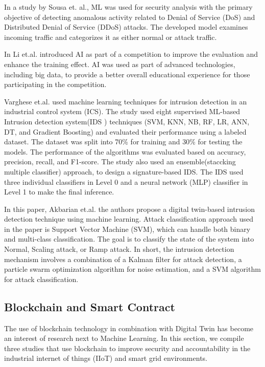 In a study by Sousa et. al.\cite{sousaELEGANTSecurityCritical2021}, ML was used for security analysis with the primary objective of detecting anomalous activity related to Denial of Service (DoS) and Distributed Denial of Service (DDoS) attacks. The developed model examines incoming traffic and categorizes it as either normal or attack traffic.  

In \cite{jiaqiliSpaceSpiderHyper2022} Li et.al. introduced AI as part of a competition to improve the evaluation and enhance the training effect. AI was used as part of advanced technologies, including big data, to provide a better overall educational experience for those participating in the competition.  

Varghese et.al.\cite{vargheseDigitalTwinbasedIntrusion2022} used machine learning techniques for intrusion detection in an industrial control system (ICS). The study used eight supervised ML-based Intrusion detection system(IDS ) techniques (SVM, KNN, NB, RF, LR, ANN, DT, and Gradient Boosting) and evaluated their performance using a labeled dataset. The dataset was split into 70\% for training and 30\% for testing the models. The performance of the algorithms was evaluated based on accuracy, precision, recall, and F1-score. The study also used an ensemble(staccking multiple classifier) approach, to design a signature-based IDS. The IDS used three individual classifiers in Level 0 and a neural network (MLP) classifier in Level 1 to make the final inference.  

 In\cite{akbarianIntrusionDetectionDigital2020} this paper, Akbarian et.al. the authors propose a digital twin-based intrusion detection technique using machine learning. Attack classification approach used in the paper is Support Vector Machine (SVM), which can handle both binary and multi-class classification. The goal is to classify the state of the system into Normal, Scaling attack, or Ramp attack. In short, the intrusion detection mechanism involves a combination of a Kalman filter for attack detection, a particle swarm optimization algorithm for noise estimation, and a SVM algorithm for attack classification.  
\subsection{Blockchain and Smart Contract}
The use of blockchain technology in combination with Digital Twin has become an interest of research next to Machine Learning. In this section, we compile three studies that use blockchain to improve security and accountability in the industrial internet of things (IIoT) and smart grid environments.  

